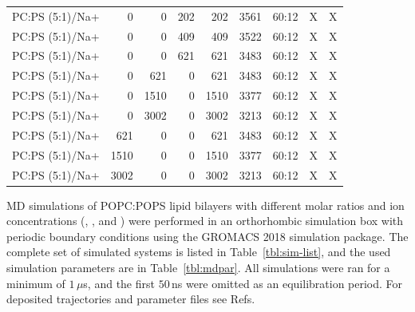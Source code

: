 \documentclass[journal=jpcbfk,manuscript=article]{achemso}
\begin{document}
\begin{table}[tbp]
\begin{tabular}{l | r r r r | r r | c c }
PC:PS (5:1)/Na+  &      0  &      0  &    202  &    202  &  3561  &  60:12  &  X  &  X  \\ 
PC:PS (5:1)/Na+  &      0  &      0  &    409  &    409  &  3522  &  60:12  &  X  &  X  \\ 
PC:PS (5:1)/Na+  &      0  &      0  &    621  &    621  &  3483  &  60:12  &  X  &  X  \\ 
PC:PS (5:1)/Na+  &      0  &    621  &      0  &    621  &  3483  &  60:12  &  X  &  X  \\ 
PC:PS (5:1)/Na+  &      0  &   1510  &      0  &   1510  &  3377  &  60:12  &  X  &  X  \\ 
PC:PS (5:1)/Na+  &      0  &   3002  &      0  &   3002  &  3213  &  60:12  &  X  &  X  \\ 
PC:PS (5:1)/Na+  &    621  &      0  &      0  &    621  &  3483  &  60:12  &  X  &  X  \\ 
PC:PS (5:1)/Na+  &   1510  &      0  &      0  &   1510  &  3377  &  60:12  &  X  &  X  \\ 
PC:PS (5:1)/Na+  &   3002  &      0  &      0  &   3002  &  3213  &  60:12  &  X  &  X  \\ 
  \hline
\end{tabular}
\end{table}


MD simulations of POPC:POPS lipid bilayers with different molar ratios 
and ion concentrations (, ,  and )
were performed in an orthorhombic simulation box with periodic boundary conditions
using the GROMACS 2018 \cite{Abraham15} simulation package. 
The complete set of simulated systems is listed in Table~\ref{tbl:sim-list},
and the used simulation parameters are in Table~\ref{tbl:mdpar}. 
All simulations were ran for a minimum of $1 \, \mu$s,
and the first  $50 \,$ns were omitted as an equilibration period. 
For deposited trajectories and parameter files see 
Refs.~
\end{document}
